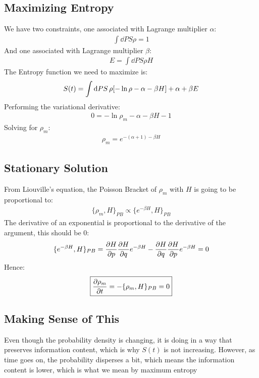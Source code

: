 \documentclass[12pt]{article}
\newcommand{\PB}[2]{\{#1,#2\}_{PB}}
\begin{document}
\subsection{Maximizing Entropy}
We have two constraints, one associated with Lagrange multiplier $\alpha$:
\begin{align*}
  \int\dd{PS}\rho=1
\end{align*}
And one associated with Lagrange multiplier $\beta$:
\begin{align*}
  E=\int\dd{PS}\rho H
\end{align*}
The Entropy function we need to maximize is:
\begin{align*}
  S(t)=\int\dd{PS}\rho\qty[-\ln\rho-\alpha-\beta H]+\alpha+\beta E
\end{align*}
Performing the variational derivative:
\begin{align*}
  0=-\ln\rho_m-\alpha-\beta H-1
\end{align*}
Solving for $\rho_m$:
\begin{align*}
  \rho_m=e^{-(\alpha+1)-\beta H}
\end{align*}
\subsection{Stationary Solution}
From Liouville's equation, the Poisson Bracket of $\rho_m$ with $H$ is going to be proportional to:
\begin{align*}
  \PB{\rho_m}{H}\propto\PB{e^{-\beta H}}{H}
\end{align*}
The derivative of an exponential is proportional to the derivative of the argument, this should be $0$:
\begin{align*}
  \PB{e^{-\beta H}}{H}=\pdv{H}{p}\pdv{H}{q}e^{-\beta H}
  -\pdv{H}{q}\pdv{H}{p}e^{-\beta H}=0
\end{align*}
Hence:
\begin{align}
  \boxed{\pdv{\rho_m}{t}=-\PB{\rho_m}{H}=0}
\end{align}
\subsection{Making Sense of This}
Even though the probability density is changing, it is doing in a way that preserves information content, which is why $S(t)$ is not increasing. However, as time goes on, the probability disperses a bit, which means the information content is lower, which is what we mean by maximum entropy
\end{document}
